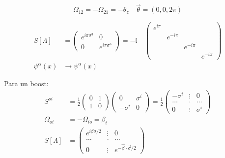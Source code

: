 \documentclass[a4paper,12pt]{article}
\begin{document}
\[
\Omega_{12} =-\Omega_{21} =- \theta_z \quad \vec \theta =(0,0, 2\pi )
\]

\begin{align*}
S[\Lambda] &= \begin{pmatrix}
    e^{i \pi \sigma^3 } &0\\0&e^{i \pi \sigma^3} 
\end{pmatrix} =    -\mathbb{I} \quad \begin{pmatrix}
    e^{i \pi}&&&\\&e^{-i \pi}&&\\&&e^{-i \pi}&\\&&&e^{-i \pi}
\end{pmatrix}\\
\psi^\alpha(x) &\to \psi^\alpha (x) 
\end{align*} 

Para un boost: 
\begin{align*}
S^{oi } &= \frac{1}{2} \begin{pmatrix}
    0&1\\1&0
\end{pmatrix} \begin{pmatrix}
    0&\sigma^i\\-\sigma^i&0
\end{pmatrix}= \frac{1}{2} \begin{pmatrix}
    -\sigma^i &\vdots &0\\\dots &. &\dots \\0& \vdots & \sigma^i
\end{pmatrix} \\
\Omega_{o i} &= - \Omega_{ i o} = \beta_i  \\
S[\Lambda ] &= \begin{pmatrix}
    e^{i\beta \sigma/2} &\vdots  &0 \\\dots& . &\dots \\0 &\vdots  & e^{- \vec \beta\cdot \vec \sigma/2}
\end{pmatrix}
\end{align*}
\end{document}
